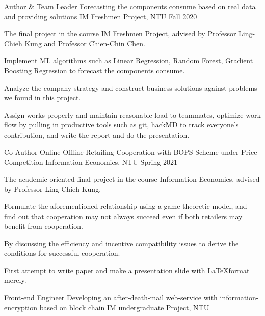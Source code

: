 \begin{cventries}
  \cventry
    {Author \& Team Leader} %
    {Forecasting the components consume based on real data and providing solutions} %
    {IM Freshmen Project, NTU} %
    {Fall 2020} %
    {
      \begin{cvitems} %
      \item {The final project in the course IM Freshmen Project, advised by Professor Ling-Chieh Kung and Professor Chien-Chin Chen.}
        \item {Implement ML algorithms such as Linear Regression, Random Forest, Gradient Boosting Regression to forecast the components consume.}
        \item {Analyze the company strategy and construct business solutions against problems we found in this project.}
        \item {Assign works properly and maintain reasonable load to teammates, optimize work flow by pulling in productive tools such as git, hackMD to track everyone's contribution, and write the report and do the presentation.}
      \end{cvitems}
    }
  \cventry
    {Co-Author}
    {Online-Offline Retailing Cooperation with BOPS Scheme under Price Competition}
    {Information Economics, NTU}
    {Spring 2021}
    {
        \begin{cvitems}
            \item {The academic-oriented final project in the course Information Economics, advised by Professor Ling-Chieh Kung.}
            \item {Formulate the aforementioned relationship using a game-theoretic model, and find out that cooperation may not always succeed even if both retailers may benefit from cooperation.}
            \item {By discussing the efficiency and incentive compatibility issues to derive the conditions for successful cooperation.}
            \item {First attempt to write paper and make a presentation slide with \LaTeX format merely.}
        \end{cvitems}
    }
  \cventry
    {Front-end Engineer} %
    {Developing an after-death-mail web-service with information-encryption based on block chain} %
    {IM undergraduate Project, NTU} %

\end{cventries}

